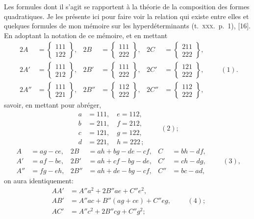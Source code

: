 \documentclass[11pt]{article}
\begin{document}
\noindent Les formules dont il s'agit se rapportent \`a la th\'eorie de la composition des formes quadratiques. Je les pr\'esente ici pour faire voir la relation qui existe entre elles et quelques formules de mon m\'emoire sur les hyperd\'eterminants (t.~\textsc{xxx}.\ p.~1), [16]. En adoptant la notation de ce m\'emoire, et en mettant
\[
\begin{aligned}
2A &= \left\{\begin{matrix}111\\122\end{matrix}\right\}, & 2B &= \left\{\begin{matrix}111\\222\end{matrix}\right\}, & 2C &= \left\{\begin{matrix}211\\222\end{matrix}\right\},\\[4pt]
2A' &= \left\{\begin{matrix}111\\212\end{matrix}\right\}, & 2B' &= \left\{\begin{matrix}111\\222\end{matrix}\right\}, & 2C' &= \left\{\begin{matrix}121\\222\end{matrix}\right\},\\[4pt]
2A'' &= \left\{\begin{matrix}111\\221\end{matrix}\right\}, & 2B'' &= \left\{\begin{matrix}112\\222\end{matrix}\right\}, & 2C'' &= \left\{\begin{matrix}112\\222\end{matrix}\right\},
\end{aligned}\qquad (1).
\]
savoir, en mettant pour abr\'eger,
\[
\begin{aligned}
a &= 111,\quad e = 112,\\
b &= 211,\quad f = 212,\\
c &= 121,\quad g = 122,\\
d &= 221,\quad h = 222\,;
\end{aligned}\qquad (2);
\]
\[
\begin{aligned}
A &= ag - ce, & 2B &= ah + bg - de - cf, & C &= bh - df,\\
A' &= af - be, & 2B' &= ah + cf - bg - de, & C' &= ch - dg,\\
A'' &= fg - eh, & 2B'' &= ah + de - bg - cf, & C'' &= bc - ad,
\end{aligned}\qquad (3),
\]
on aura identiquement:
\[
\begin{aligned}
AA' &= A''a^{2} + 2B''ae + C''e^{2},\\
AB' &= A''ac + B''(ag + ce) + C''eg,\\
AC' &= A''c^{2} + 2B''cg + C''g^{2};
\end{aligned}\qquad (4);
\]
\end{document}
